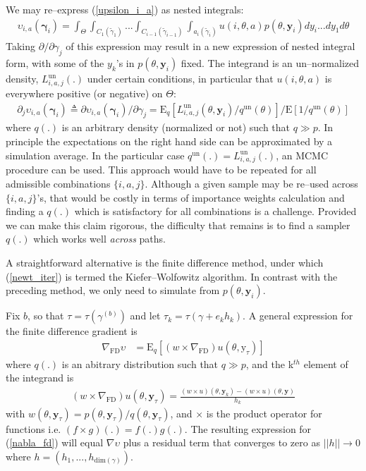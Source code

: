 \documentclass[11pt]{article}
\begin{document}
We may re--express (\ref{upsilon_i_a}) as nested integrals:
\begin{align}\label{upsilon_i_a_alt}
\upsilon_{i,a}(\boldsymbol{\gamma}_i)=\int_{\Theta}\int_{C_1(\tilde \gamma_1)}...\int_{C_{i-1}(\tilde \gamma_{i-1})}\int_{a_i(\tilde \gamma_i)}u(i,\theta,a)p(\theta,\mathbf{y}_i)dy_i...d y_1 d\theta
\end{align}Taking $\partial/\partial \gamma_j$ of this expression may result in a new expression of nested integral form, with some of the $y_k$'s in $p(\theta,\mathbf{y}_i)$ fixed. The integrand is an un--normalized density, $L_{i,a,j}^{\mathrm{un}}(.)$ under certain conditions, in particular that $u(i,\theta,a)$ is everywhere positive (or negative) on $\Theta$:
\begin{align}
\partial_j \upsilon_{i,a}(\boldsymbol{\gamma}_i)\triangleq \partial \upsilon_{i,a}(\boldsymbol{\gamma}_i)/\partial\gamma_j=\mathrm{E}_q[L_{i,a,j}^{\mathrm{un}}(\theta,\mathbf{y}_i)/q^{\mathrm{un}}(\theta)]/\mathrm{E}[1/q^{\mathrm{un}}(\theta)]
\end{align}where $q(.)$ is an arbitrary density (normalized or not) such that $q \gg p$.
In principle the expectations on the right hand side can be approximated by a simulation average. In the particular case $q^{\mathrm{un}}(.)=L_{i,a,j}^{\mathrm{un}}(.)$, an MCMC procedure can be used. This approach would have to be repeated for all admissible combinations $\{i,a,j\}$. Although a given sample may be re--used across $\{i,a,j\}$'s, that would be costly in terms of importance weights calculation and finding a $q(.)$ which is satisfactory for all combinations is a challenge. Provided we can make this claim rigorous, the difficulty that remains is to find a sampler $q(.)$ which works well \emph{across} paths. \par

A straightforward alternative is the finite difference method, under which (\ref{newt_iter}) is termed the Kiefer--Wolfowitz algorithm. In contrast with the preceding method, we only need to simulate from $p(\theta,\mathbf{y}_i)$.

Fix $b$, so that $\tau=\tau(\gamma^{(b)})$ and let $\tau_k=\tau(\gamma+e_k h_k)$. A general expression for the finite difference gradient is 
\begin{align}\label{nabla_fd}
\nabla_{\mathrm{FD}} \upsilon &= \mathrm{E}_q[(w\times \nabla_{\mathrm{FD}})u(\theta,\mathrm{y}_\tau)]
\end{align}where $q(.)$ is an abitrary distribution such that $q\gg p$, and the k$^{th}$ element of the integrand is
\begin{align}\label{nabla_u_is}
(w\times \nabla_{\mathrm{FD}})u(\theta,\mathbf{y}_{\tau})=\frac{(w\times u)(\theta,\mathbf{y}_k)-(w\times u)(\theta,\mathbf{y})}{h_k}
\end{align}with $w(\theta,\mathbf{y}_{\tau})=p(\theta,\mathbf{y}_{\tau})/q(\theta,\mathbf{y}_{\tau})$, and $\times$ is the product operator for functions i.e. $(f\times g)(.)=f(.)g(.)$. The resulting expression for (\ref{nabla_fd}) will equal $\nabla \upsilon$ plus a residual term that converges to zero as $||h||\rightarrow 0$ where $h=(h_1,...,h_{\mathrm{dim}(\gamma)})$.
\end{document}

